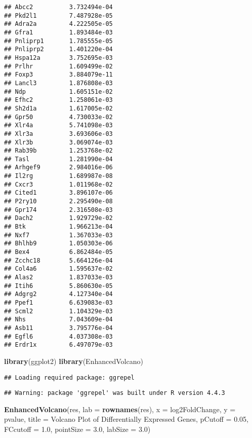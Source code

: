 \documentclass[
]{article}
\newenvironment{Shaded}{\begin{snugshade}}{\end{snugshade}}
\newcommand{\AttributeTok}[1]{\textcolor[rgb]{0.13,0.29,0.53}{#1}}
\newcommand{\FloatTok}[1]{\textcolor[rgb]{0.00,0.00,0.81}{#1}}
\newcommand{\FunctionTok}[1]{\textcolor[rgb]{0.13,0.29,0.53}{\textbf{#1}}}
\newcommand{\NormalTok}[1]{#1}
\newcommand{\StringTok}[1]{\textcolor[rgb]{0.31,0.60,0.02}{#1}}
\begin{document}
\begin{verbatim}
## Abcc2          3.732494e-04
## Pkd2l1         7.487928e-05
## Adra2a         4.222505e-05
## Gfra1          1.893484e-03
## Pnliprp1       1.785555e-05
## Pnliprp2       1.401220e-04
## Hspa12a        3.752695e-03
## Prlhr          1.609499e-02
## Foxp3          3.884079e-11
## Lancl3         1.876808e-03
## Ndp            1.605151e-02
## Efhc2          1.258061e-03
## Sh2d1a         1.617005e-02
## Gpr50          4.730033e-02
## Xlr4a          5.741098e-03
## Xlr3a          3.693606e-03
## Xlr3b          3.069074e-03
## Rab39b         1.253768e-02
## Tasl           1.281990e-04
## Arhgef9        2.984016e-06
## Il2rg          1.689987e-08
## Cxcr3          1.011968e-02
## Cited1         3.896107e-06
## P2ry10         2.295490e-08
## Gpr174         2.316508e-03
## Dach2          1.929729e-02
## Btk            1.966213e-04
## Nxf7           1.367033e-03
## Bhlhb9         1.050303e-06
## Bex4           6.862484e-05
## Zcchc18        5.664126e-04
## Col4a6         1.595637e-02
## Alas2          1.837033e-03
## Itih6          5.860630e-05
## Adgrg2         4.127340e-04
## Ppef1          6.639083e-03
## Scml2          1.104329e-03
## Nhs            7.043609e-04
## Asb11          3.795776e-04
## Egfl6          4.037308e-03
## Erdr1x         6.497079e-03
\end{verbatim}

\begin{Shaded}
\begin{Highlighting}[]
\FunctionTok{library}\NormalTok{(ggplot2)}
\FunctionTok{library}\NormalTok{(EnhancedVolcano)}
\end{Highlighting}
\end{Shaded}

\begin{verbatim}
## Loading required package: ggrepel
\end{verbatim}

\begin{verbatim}
## Warning: package 'ggrepel' was built under R version 4.4.3
\end{verbatim}

\begin{Shaded}
\begin{Highlighting}[]
\FunctionTok{EnhancedVolcano}\NormalTok{(res,}
                \AttributeTok{lab =} \FunctionTok{rownames}\NormalTok{(res),}
                \AttributeTok{x =} \StringTok{\textquotesingle{}log2FoldChange\textquotesingle{}}\NormalTok{,}
                \AttributeTok{y =} \StringTok{\textquotesingle{}pvalue\textquotesingle{}}\NormalTok{,}
                \AttributeTok{title =} \StringTok{\textquotesingle{}Volcano Plot of Differentially Expressed Genes\textquotesingle{}}\NormalTok{,}
                \AttributeTok{pCutoff =} \FloatTok{0.05}\NormalTok{,}
                \AttributeTok{FCcutoff =} \FloatTok{1.0}\NormalTok{,}
                \AttributeTok{pointSize =} \FloatTok{3.0}\NormalTok{,}
                \AttributeTok{labSize =} \FloatTok{3.0}\NormalTok{)}
\end{Highlighting}
\end{Shaded}
\end{document}
